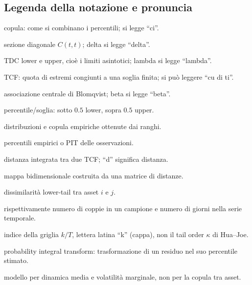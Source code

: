 \documentclass[11pt,a4paper]{article}
\begin{document}
\subsection*{Legenda della notazione e pronuncia}
\begin{description}[leftmargin=3.8cm,style=nextline]
  \item[$C$] copula: come si combinano i percentili; si legge ``ci''.
  \item[$\delta_C(t)$] sezione diagonale $C(t,t)$; delta si legge ``delta''.
  \item[$\lambda_L,\lambda_U$] TDC lower e upper, cioè i limiti asintotici;
  lambda si legge ``lambda''.
  \item[$q_C(t)$] TCF: quota di estremi congiunti a una soglia finita; si può
  leggere ``cu di ti''.
  \item[$\beta_C$] associazione centrale di Blomqvist; beta si legge ``beta''.
  \item[$t$] percentile/soglia: sotto $0.5$ lower, sopra $0.5$ upper.
  \item[$F_n,G_n,C_n$] distribuzioni e copula empiriche ottenute dai ranghi.
  \item[$U_i,V_i$] percentili empirici o PIT delle osservazioni.
  \item[$d(C_i,C_j)$] distanza integrata tra due TCF; ``d'' significa distanza.
  \item[MDS] mappa bidimensionale costruita da una matrice di distanze.
  \item[$d_{ij}$] dissimilarità lower-tail tra asset $i$ e $j$.
  \item[$n,T$] rispettivamente numero di coppie in un campione e numero di
  giorni nella serie temporale.
  \item[$k$] indice della griglia $k/T$, lettera latina ``k'' (cappa), non il
  tail order $\kappa$ di Hua--Joe.
  \item[PIT] probability integral transform: trasformazione di un residuo nel
  suo percentile stimato.
  \item[ARMA--GARCH] modello per dinamica media e volatilità marginale, non per
  la copula tra asset.
\end{description}
\end{document}
